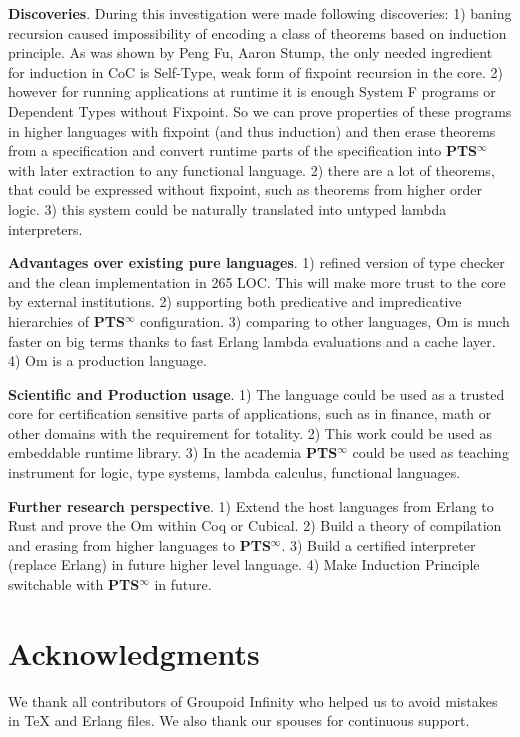 \documentclass{aip-cp}
\begin{document}
{\bf Discoveries}.
 During this investigation were made following discoveries:
1) baning recursion caused impossibility of encoding a class of theorems based on induction principle.
As was shown by Peng Fu, Aaron Stump\cite{Fu14}, the only needed ingredient for induction in CoC is Self-Type, weak form of fixpoint recursion in the core.
2) however for running applications at runtime it is enough System F programs or Dependent Types without Fixpoint.
So we can prove properties of these programs in higher languages with fixpoint (and thus induction) and then erase theorems from a specification and convert runtime parts of the specification into {\bf PTS$^\infty$} with later extraction to any functional language.
2) there are a lot of theorems, that could be expressed without fixpoint, such as theorems from higher order logic.
3) this system could be naturally translated into untyped lambda interpreters.

{\bf Advantages over existing pure languages}.
1) refined version of type checker and the clean implementation in 265 LOC.
This will make more trust to the core by external institutions.
2) supporting both predicative and impredicative hierarchies of {\bf PTS$^\infty$} configuration.
3) comparing to other languages, Om is much faster on big terms
thanks to fast Erlang lambda evaluations and a cache layer.
4) Om is a production language.

{\bf Scientific and Production usage}.
1) The language could be used as a trusted core for certification sensitive parts of applications, such as in finance, math or other domains with the requirement for totality.
2) This work could be used as embeddable runtime library.
3) In the academia {\bf PTS$^\infty$} could be used as teaching instrument for logic, type systems, lambda calculus, functional languages.

{\bf Further research perspective}.
1) Extend the host languages from Erlang to Rust and prove the Om within Coq or Cubical.
2) Build a theory of compilation and erasing from higher languages to {\bf PTS$^\infty$}.
3) Build a certified interpreter (replace Erlang) in future higher level language.
4) Make Induction Principle switchable with {\bf PTS$^\infty$} in future.

\section{Acknowledgments}
We thank all contributors of Groupoid Infinity who helped us to avoid mistakes in TeX and Erlang files.
We also thank our spouses for continuous support.



\newpage
\tableofcontents
\end{document}
